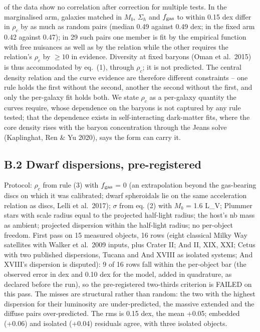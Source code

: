 \documentclass[
  10pt,
]{article}
\begin{document}
of the data show no correlation after correction for multiple tests. In the marginalised arm, galaxies matched in $M_b$, $\Sigma_h$ and $f_{\rm gas}$ to within 0.15 dex differ in $\rho_c$ by as much as random pairs (median 0.49 against 0.49 dex; in the fixed arm 0.42 against 0.47); in 29 such pairs one member is fit by the empirical function with free nuisances as well as by the relation while the other requires the relation's $\rho_c$ by $\geq10$ in evidence. Diversity at fixed baryons (Oman et al.~2015) is thus accommodated by eq.~(1), through $\rho_c$; it is not predicted. The central density relation and the curve evidence are therefore different constraints -- one rule holds the first without the second, another the second without the first, and only the per-galaxy fit holds both. We state $\rho_c$ as a per-galaxy quantity the curves require, whose dependence on the baryons is not captured by any rule tested; that the dependence exists in self-interacting dark-matter fits, where the core density rises with the baryon concentration through the Jeans solve (Kaplinghat, Ren \& Yu 2020), says the form can carry it.

\subsection{B.2 Dwarf dispersions, pre-registered}

Protocol: $\rho_c$ from rule (3) with $f_{\rm gas}$ = 0 (an extrapolation beyond the gas-bearing discs on which it was calibrated; dwarf spheroidals lie on the same acceleration relation as discs, Lelli et al.~2017); $\sigma$ from eq. (2) with $M_b$ = 1.6 L\_V; Plummer stars with scale radius equal to the projected half-light radius; the host's nb mass as ambient; projected dispersion within the half-light radius; no per-object freedom. First pass on 15 measured objects, 16 rows (eight classical Milky Way satellites with Walker et al.~2009 inputs, plus Crater II; And II, XIX, XXI; Cetus with two published dispersions, Tucana and And XVIII as isolated systems; And XVIII's dispersion is disputed): 9 of 16 rows fall within the per-object bar (the observed error in dex and 0.10 dex for the model, added in quadrature, as declared before the run), so the pre-registered two-thirds criterion is FAILED on this pass. The misses are structural rather than random: the two with the highest dispersion for their luminosity are under-predicted, the massive extended and the diffuse pairs over-predicted. The rms is 0.15 dex, the mean +0.05; embedded (+0.06) and isolated (+0.04) residuals agree, with three isolated objects.
\end{document}
